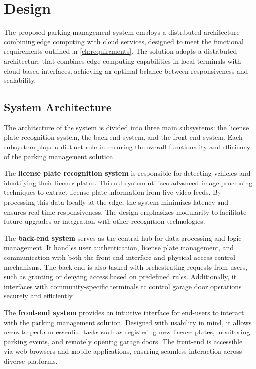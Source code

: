 \chapter{Design}\label{ch:design}

The proposed parking management system employs a distributed architecture combining edge computing with cloud services, designed to meet the functional requirements outlined in \ref{ch:requirements}. The solution adopts a distributed architecture that combines edge computing capabilities in local terminals with cloud-based interfaces, achieving an optimal balance between responsiveness and scalability.

\section{System Architecture}

The architecture of the system is divided into three main subsystems: the license plate recognition system, the back-end system, and the front-end system. Each subsystem plays a distinct role in ensuring the overall functionality and efficiency of the parking management solution.

The \textbf{license plate recognition system} is responsible for detecting vehicles and identifying their license plates. This subsystem utilizes advanced image processing techniques to extract license plate information from live video feeds. By processing this data locally at the edge, the system minimizes latency and ensures real-time responsiveness. The design emphasizes modularity to facilitate future upgrades or integration with other recognition technologies.

The \textbf{back-end system} serves as the central hub for data processing and logic management. It handles user authentication, license plate management, and communication with both the front-end interface and physical access control mechanisms. The back-end is also tasked with orchestrating requests from users, such as granting or denying access based on predefined rules. Additionally, it interfaces with community-specific terminals to control garage door operations securely and efficiently.

The \textbf{front-end system} provides an intuitive interface for end-users to interact with the parking management solution. Designed with usability in mind, it allows users to perform essential tasks such as registering new license plates, monitoring parking events, and remotely opening garage doors. The front-end is accessible via web browsers and mobile applications, ensuring seamless interaction across diverse platforms.


